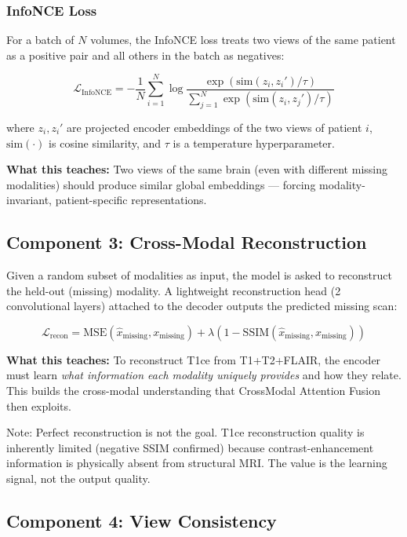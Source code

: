 \documentclass[12pt,a4paper]{article}
\begin{document}
\subsubsection{InfoNCE Loss}
For a batch of $N$ volumes, the InfoNCE loss treats two views of the same patient as a positive pair and all others in the batch as negatives:

\[
\mathcal{L}_{\text{InfoNCE}} = -\frac{1}{N} \sum_{i=1}^{N} \log \frac{\exp(\text{sim}(z_i, z_i')/\tau)}{\sum_{j=1}^{N} \exp(\text{sim}(z_i, z_j')/\tau)}
\]

where $z_i, z_i'$ are projected encoder embeddings of the two views of patient $i$, $\text{sim}(\cdot)$ is cosine similarity, and $\tau$ is a temperature hyperparameter.

\textbf{What this teaches:} Two views of the same brain (even with different missing modalities) should produce similar global embeddings --- forcing modality-invariant, patient-specific representations.

\subsection{Component 3: Cross-Modal Reconstruction}

Given a random subset of modalities as input, the model is asked to reconstruct the held-out (missing) modality. A lightweight reconstruction head (2 convolutional layers) attached to the decoder outputs the predicted missing scan:

\[
\mathcal{L}_{\text{recon}} = \text{MSE}(\hat{x}_{\text{missing}}, x_{\text{missing}}) + \lambda(1 - \text{SSIM}(\hat{x}_{\text{missing}}, x_{\text{missing}}))
\]

\textbf{What this teaches:} To reconstruct T1ce from T1+T2+FLAIR, the encoder must learn \emph{what information each modality uniquely provides} and how they relate. This builds the cross-modal understanding that CrossModal Attention Fusion then exploits.

Note: Perfect reconstruction is not the goal. T1ce reconstruction quality is inherently limited (negative SSIM confirmed) because contrast-enhancement information is physically absent from structural MRI. The value is the learning signal, not the output quality.

\subsection{Component 4: View Consistency}
\end{document}
